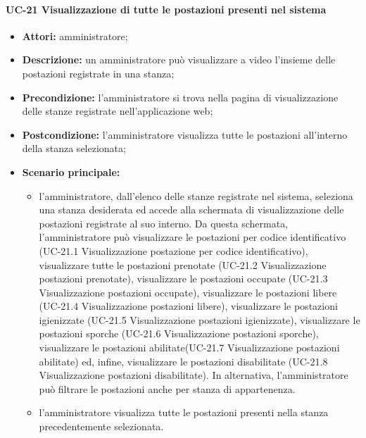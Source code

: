 \paragraph{UC-21 Visualizzazione di tutte le postazioni presenti nel sistema}
\begin{itemize}
    \item \textbf{Attori:} amministratore;
    \item \textbf{Descrizione:} un amministratore pu\`{o} visualizzare a video l'insieme delle postazioni registrate in una stanza;
    \item \textbf{Precondizione:} l'amministratore si trova nella pagina di visualizzazione delle stanze registrate nell'applicazione web;
    \item \textbf{Postcondizione:} l'amministratore visualizza tutte le postazioni all'interno della stanza selezionata;
    \item \textbf{Scenario principale:}
    \begin{itemize}
        \item l'amministratore, dall'elenco delle stanze registrate nel sistema, seleziona una stanza desiderata ed accede alla schermata di visualizzazione delle postazioni registrate al suo interno. Da questa schermata, l'amministratore può visualizzare le postazioni per codice identificativo (UC-21.1 Visualizzazione postazione per codice identificativo), visualizzare tutte le postazioni prenotate (UC-21.2 Visualizzazione postazioni prenotate), visualizzare le postazioni occupate (UC-21.3 Visualizzazione postazioni occupate), visualizzare le postazioni libere (UC-21.4 Visualizzazione postazioni libere), visualizzare le postazioni igienizzate (UC-21.5 Visualizzazione postazioni igienizzate), visualizzare le postazioni sporche (UC-21.6 Visualizzazione postazioni sporche), visualizzare le postazioni abilitate(UC-21.7 Visualizzazione postazioni abilitate) ed, infine, visualizzare le postazioni disabilitate (UC-21.8 Visualizzazione postazioni disabilitate). In alternativa, l'amministratore può filtrare le postazioni anche per stanza di appartenenza.
        \item l'amministratore visualizza tutte le postazioni presenti nella stanza precedentemente selezionata.
    \end{itemize}
\end{itemize}

